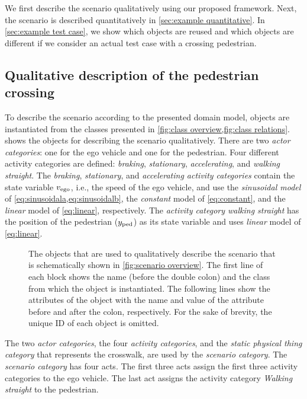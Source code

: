 We first describe the scenario qualitatively using our proposed \cstartb framework\cendb. Next, the scenario is described quantitatively in \cref{sec:example quantitative}. 
In \cref{sec:example test case}, we show \cstarte which objects are reused and which objects are different if we consider an actual test case with a crossing pedestrian. \cende



\subsection{Qualitative description of the pedestrian crossing}
\label{sec:example qualitative}

To describe the scenario according to the presented domain model, objects are instantiated from the classes presented in \cref{fig:class overview,fig:class relations}.  shows the objects for describing the scenario qualitatively. There are two \textit{actor categories}: one for the ego vehicle and one for the pedestrian. Four different activity categories are defined: \textit{braking}, \textit{stationary}, \textit{accelerating}, and \emph{walking straight}. 
\cstarte The \textit{braking}, \textit{stationary}, and \textit{accelerating activity categories} contain the state variable $v_{\mathrm{ego}}$, i.e., the speed of the ego vehicle, and use the \textit{sinusoidal model} of \cref{eq:sinusoidala,eq:sinusoidalb}, the \textit{constant} model of \cref{eq:constant}, and the \textit{linear} model of \cref{eq:linear}, respectively. 
The \textit{activity category walking straight} has the position of the pedestrian ($y_{\mathrm{ped}}$) as its state variable and uses \textit{linear} model of \cref{eq:linear}. \cende 

\begin{figure*}[t]
	\centering
	
	\caption{The objects that are used to qualitatively describe the scenario that is schematically shown in \cref{fig:scenario overview}. The first line of each block shows the name (before the double colon) and the class from which the object is instantiated. The following lines show the attributes of the object with the name and value of the attribute before and after the colon, respectively. For the sake of brevity, the unique ID of each object is omitted.}
	\label{fig:example qualitative}
\end{figure*}


The two \textit{actor categories}, the four \textit{activity categories}, and the \cstartc\textit{static physical thing category} \cendc\cstartd that represents the crosswalk\cendd, are used by the \textit{scenario category}. The \textit{scenario category} has four acts. The first three acts assign the first three activity categories to the ego vehicle. The last act assigns the activity category \emph{Walking straight} to the pedestrian. 



